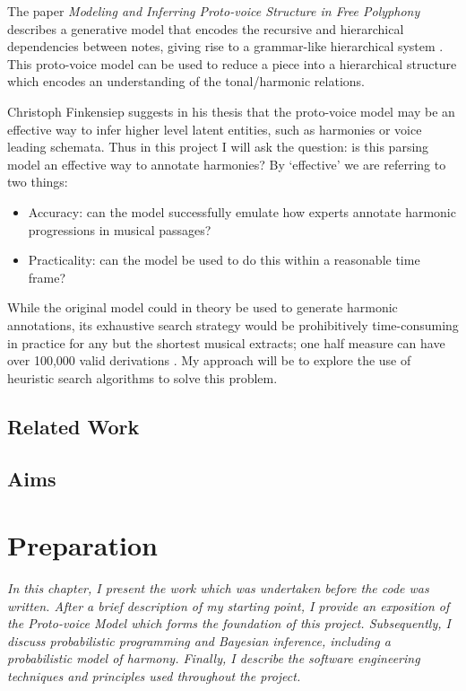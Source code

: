 \documentclass[12pt,a4paper,twoside,openright]{report}
\begin{document}
\par
The paper \textit{Modeling and Inferring Proto-voice Structure in Free Polyphony} describes a generative model that encodes the recursive and hierarchical dependencies between notes, giving rise to a grammar-like hierarchical system \cite{finkensiepMODELINGINFERRINGPROTOVOICE2021}. This proto-voice model can be used to reduce a piece into a hierarchical structure which encodes an understanding of the tonal/harmonic relations.
\par
Christoph Finkensiep suggests in his thesis that the proto-voice model may be an effective way to infer higher level latent entities, such as harmonies or voice leading schemata. Thus in this project I will ask the question: is this parsing model an effective way to annotate harmonies? By ‘effective’ we are referring to two things:
\begin{itemize}
  \item Accuracy: can the model successfully emulate how experts annotate harmonic progressions in musical passages? 
  \item Practicality: can the model be used to do this within a reasonable time frame?
\end{itemize}

While the original model could in theory be used to generate harmonic annotations, its exhaustive search strategy would be prohibitively time-consuming in practice for any but the shortest musical extracts; one half measure can have over 100,000 valid derivations \cite{finkensiepStructureFreePolyphony2023}. My approach will be to explore the use of heuristic search algorithms to solve this problem.

\section{Related Work}


\section{Aims}


\chapter{Preparation}
\textit{In this chapter, I present the work which was undertaken before the code was written. After a brief description of my starting point, I provide an exposition of the Proto-voice Model which forms the foundation of this project. Subsequently, I discuss probabilistic programming and Bayesian inference, including a probabilistic model of harmony. Finally, I describe the software engineering techniques and principles used throughout the project. }
\end{document}
